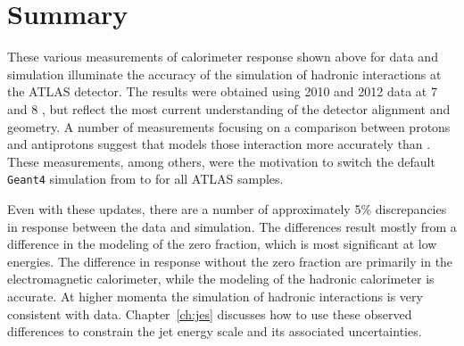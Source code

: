 
\section{Summary}

These various measurements of calorimeter response shown above for data and simulation illuminate the accuracy of the simulation of hadronic interactions at the ATLAS detector. 
The results were obtained using 2010 and 2012 data at 7 and 8 \TeV, but reflect the most current understanding of the detector alignment and geometry.
A number of measurements focusing on a comparison between protons and antiprotons suggest that \FTFP models those interaction more accurately than \QGSP.
These measurements, among others, were the motivation to switch the default \texttt{Geant4} simulation from \QGSP to \FTFP for all ATLAS samples. 

Even with these updates, there are a number of approximately 5\% discrepancies in response between the data and simulation.
The differences result mostly from a difference in the modeling of the zero fraction, which is most significant at low energies.
The difference in response without the zero fraction are primarily in the electromagnetic calorimeter, while the modeling of the hadronic calorimeter is accurate.
At higher momenta the simulation of hadronic interactions is very consistent with data. 
Chapter~\ref{ch:jes} discusses how to use these observed differences to constrain the jet energy scale and its associated uncertainties.
